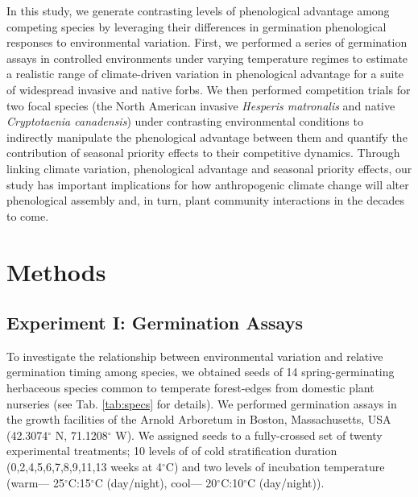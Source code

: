 \documentclass{article}[11pt]
\begin{document}
In this study, we generate contrasting levels of phenological advantage among competing species by leveraging their differences in germination phenological responses to environmental variation. First, we performed a series of germination assays in controlled environments under varying temperature regimes to estimate a realistic range of climate-driven variation in phenological advantage for a suite of widespread invasive and native forbs. We then performed competition trials for two focal species (the North American invasive \textit{Hesperis matronalis} and native \textit{Cryptotaenia canadensis}) under contrasting environmental conditions to indirectly manipulate the phenological advantage between them and quantify the contribution of seasonal priority effects to their competitive dynamics. Through linking climate variation, phenological advantage and seasonal priority effects, our study has important implications for how anthropogenic climate change will alter phenological assembly and, in turn, plant community interactions in the decades to come.

\section*{Methods}
\subsection*{Experiment I: Germination Assays}
To investigate the relationship between environmental variation and relative germination timing among species, we obtained seeds of 14 spring-germinating herbaceous species common to temperate forest-edges from domestic plant nurseries (see Tab. \ref{tab:specs} for details). We performed germination assays in the growth facilities of the Arnold Arboretum in Boston, Massachusetts, USA (42.3074$^{\circ}$ N, 71.1208$^{\circ}$ W). We assigned seeds to a fully-crossed set of twenty experimental treatments; 10 levels of of cold stratification duration (0,2,4,5,6,7,8,9,11,13 weeks at 4$^{\circ}$C) and two levels of incubation temperature (warm--- 25$^{\circ}$C:15$^{\circ}$C (day/night), cool--- 20$^{\circ}$C:10$^{\circ}$C (day/night)).
\end{document}
